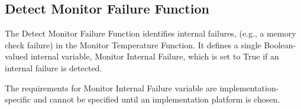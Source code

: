 \subsection{Detect Monitor Failure Function}
\label{subsec:DMFF}

The Detect Monitor Failure Function identifies internal failures, (e.g., a memory check failure)
in the Monitor Temperature Function. It defines a single Boolean-valued internal variable,
Monitor Internal Failure, which is set to True if an internal failure is detected.

The requirements for Monitor Internal Failure variable are implementation-specific and cannot
be specified until an implementation platform is chosen.